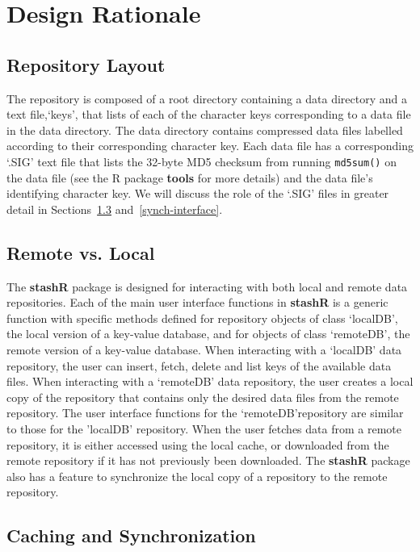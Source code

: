 \documentclass{article}
\newcommand{\pkg}{\textbf}
\newcommand{\code}{\texttt}
\begin{document}
\section{Design Rationale}


\subsection{Repository Layout} \label{layout}

The repository is composed of a root directory containing a data directory and
a text file,`keys', that lists of each of the character keys corresponding
to a data file in the data directory. The data directory contains compressed
data files labelled according to their corresponding character key. Each data file
has a corresponding `.SIG' text file that lists the 32-byte MD5 checksum from 
running \code{md5sum()} on the data file (see the R package \pkg{tools} for more 
details) and the data file's identifying character key. We will discuss the role 
of the `.SIG' files in greater detail in Sections~\ref{synch-rationale} 
and~\ref{synch-interface}. 
 
\subsection{Remote vs. Local}

The \pkg{stashR} package is designed for interacting with
both local and remote data repositories. Each of the main user
interface functions in \pkg{stashR} is a generic function 
with specific methods defined for repository objects of class
`localDB', the local version of a key-value database, and for
objects of class `remoteDB', the remote version of a key-value
database. When interacting with a `localDB' data repository, 
the user can insert, fetch, delete and list keys of the available 
data files. When interacting with a `remoteDB' data 
repository, the user creates a local copy of the repository that
contains only the desired data files from the remote repository. The 
user interface functions for the `remoteDB'repository 
are similar to those for the 'localDB' repository. When 
the user fetches data from a remote repository, it is either accessed 
using the local cache, or downloaded from the remote repository if it has not
previously been downloaded. The \pkg{stashR} package also
has a feature to synchronize the local copy of a repository to the
remote repository.


\subsection{Caching and Synchronization} \label{synch-rationale}
\end{document}
